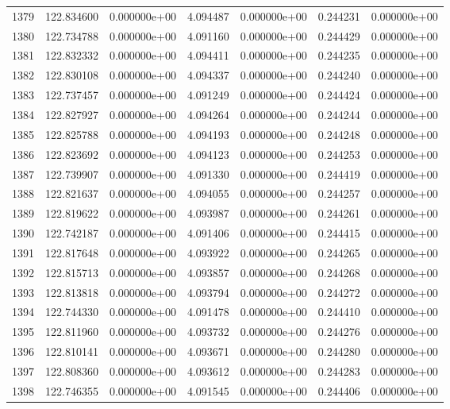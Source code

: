 \begin{tabular}{rrrrrrr}
1379 & 122.834600 &  0.000000e+00 &  4.094487 &  0.000000e+00 &    0.244231 &  0.000000e+00 \\
1380 & 122.734788 &  0.000000e+00 &  4.091160 &  0.000000e+00 &    0.244429 &  0.000000e+00 \\
1381 & 122.832332 &  0.000000e+00 &  4.094411 &  0.000000e+00 &    0.244235 &  0.000000e+00 \\
1382 & 122.830108 &  0.000000e+00 &  4.094337 &  0.000000e+00 &    0.244240 &  0.000000e+00 \\
1383 & 122.737457 &  0.000000e+00 &  4.091249 &  0.000000e+00 &    0.244424 &  0.000000e+00 \\
1384 & 122.827927 &  0.000000e+00 &  4.094264 &  0.000000e+00 &    0.244244 &  0.000000e+00 \\
1385 & 122.825788 &  0.000000e+00 &  4.094193 &  0.000000e+00 &    0.244248 &  0.000000e+00 \\
1386 & 122.823692 &  0.000000e+00 &  4.094123 &  0.000000e+00 &    0.244253 &  0.000000e+00 \\
1387 & 122.739907 &  0.000000e+00 &  4.091330 &  0.000000e+00 &    0.244419 &  0.000000e+00 \\
1388 & 122.821637 &  0.000000e+00 &  4.094055 &  0.000000e+00 &    0.244257 &  0.000000e+00 \\
1389 & 122.819622 &  0.000000e+00 &  4.093987 &  0.000000e+00 &    0.244261 &  0.000000e+00 \\
1390 & 122.742187 &  0.000000e+00 &  4.091406 &  0.000000e+00 &    0.244415 &  0.000000e+00 \\
1391 & 122.817648 &  0.000000e+00 &  4.093922 &  0.000000e+00 &    0.244265 &  0.000000e+00 \\
1392 & 122.815713 &  0.000000e+00 &  4.093857 &  0.000000e+00 &    0.244268 &  0.000000e+00 \\
1393 & 122.813818 &  0.000000e+00 &  4.093794 &  0.000000e+00 &    0.244272 &  0.000000e+00 \\
1394 & 122.744330 &  0.000000e+00 &  4.091478 &  0.000000e+00 &    0.244410 &  0.000000e+00 \\
1395 & 122.811960 &  0.000000e+00 &  4.093732 &  0.000000e+00 &    0.244276 &  0.000000e+00 \\
1396 & 122.810141 &  0.000000e+00 &  4.093671 &  0.000000e+00 &    0.244280 &  0.000000e+00 \\
1397 & 122.808360 &  0.000000e+00 &  4.093612 &  0.000000e+00 &    0.244283 &  0.000000e+00 \\
1398 & 122.746355 &  0.000000e+00 &  4.091545 &  0.000000e+00 &    0.244406 &  0.000000e+00 \\

\end{tabular}
